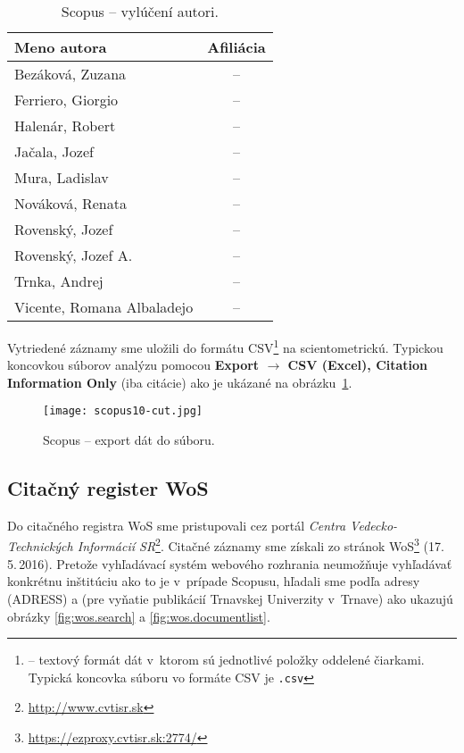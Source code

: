 \begin{SCtable}
\centering\small
\caption{Scopus -- vylúčení autori.}
\label{tab:scopus.exauthors}
\begin{tabular}{lc}
  \hline\noalign{\vspace{.3ex}}
  Meno autora                & Afiliácia \\[0.3ex]
  \hline\noalign{\vspace{.5ex}}
  Bezáková, Zuzana           & -- \\
  Ferriero, Giorgio          & -- \\
  Halenár, Robert            & -- \\
  Jačala, Jozef              & -- \\
  Mura, Ladislav             & -- \\[1ex]
  Nováková, Renata           & -- \\
  Rovenský, Jozef            & -- \\
  Rovenský, Jozef A.         & -- \\
  Trnka, Andrej              & -- \\
  Vicente, Romana Albaladejo & -- \\[0.5ex]
  \hline
\end{tabular}
\end{SCtable}

Vytriedené záznamy sme uložili do formátu CSV\footnote{ -- textový formát dát v~ktorom sú jednotlivé položky oddelené
  čiarkami.  Typická koncovka súboru vo formáte CSV je \texttt{.csv}} na
scientometrickú.  Typickou koncovkou súborov analýzu pomocou \textbf{Export
  $\rightarrow$ CSV (Excel), Citation Information Only} (iba citácie) ako je
ukázané na obrázku~\ref{fig:scopus.export}.

\begin{figure}
  \centering
  \texttt{[image: scopus10-cut.jpg]}
  \caption{Scopus -- export dát do súboru.}
  \label{fig:scopus.export}
\end{figure}


\subsection{Citačný register WoS}

Do citačného registra WoS sme pristupovali cez portál \emph{Centra
  Vedecko-Technických Informácií SR}\footnote{\url{http://www.cvtisr.sk}}.
Citačné záznamy sme získali zo stránok
WoS\footnote{\url{https://ezproxy.cvtisr.sk:2774/}} (17.\,5.\,2016).  Pretože
vyhľadávací systém webového rozhrania neumožňuje vyhľadávať konkrétnu inštitúciu
ako to je v~prípade Scopusu, hľadali sme podľa adresy (ADRESS)  a
 (pre vyňatie publikácií Trnavskej Univerzity v~Trnave) ako
ukazujú obrázky \ref{fig:wos.search} a \ref{fig:wos.documentlist}.

